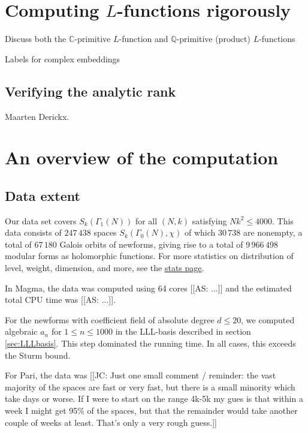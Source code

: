 \documentclass[11pt]{amsart}
\numberwithin{equation}{subsection}
\theoremstyle{plain}
\theoremstyle{definition}
\newcommand{\Q}{\mathbb{Q}}
\newcommand{\C}{\mathbb{C}}
\newcommand{\as}[1]{{\color{pastelred} \textsf{[[AS: #1]]}}}
\newcommand{\jc}[1]{{\color{orange} \textsf{[[JC: #1]]}}}
\begin{document}
\section{Computing $L$-functions rigorously}

Discuss both the $\C$-primitive $L$-function and $\Q$-primitive (product) $L$-functions

Labels for complex embeddings

\subsection{Verifying the analytic rank}

Maarten Derickx.

\section{An overview of the computation}

\subsection{Data extent}

Our data set covers $S_k(\Gamma_1(N))$ for all $(N,k)$ satisfying $Nk^2 \leq 4000$.  This data consists of $247\,438$ spaces $S_k(\Gamma_0(N),\chi)$ of which $30\,738$ are nonempty, a total of $67\,180$ Galois orbits of newforms, giving rise to a total of $9\,966\,498$ modular forms as holomorphic functions.  For more statistics on distribution of level, weight, dimension, and more, see the \href{http://cmfs.lmfdb.xyz/ModularForm/GL2/Q/holomorphic/stats}{stats page}.

In Magma, the data was computed using 64 cores \as{...} and the estimated total CPU time was \as{...}.  

For the newforms with coefficient field of absolute degree $d \leq 20$, we computed algebraic $a_n$ for $1 \leq n \leq 1000$ in the LLL-basis described in section \ref{sec:LLLbasis}.  This step dominated the running time.  In all cases, this exceeds the Sturm bound.

For Pari, the data was \jc{Just one small comment / reminder: the vast majority of the spaces are fast or very fast, but there is a small minority which take days or worse.  If I were to start on the range 4k-5k my gues is that within a week I might get 95\% of the spaces, but that the remainder would take another couple of weeks at least.  That's only a very rough guess.}
\end{document}
